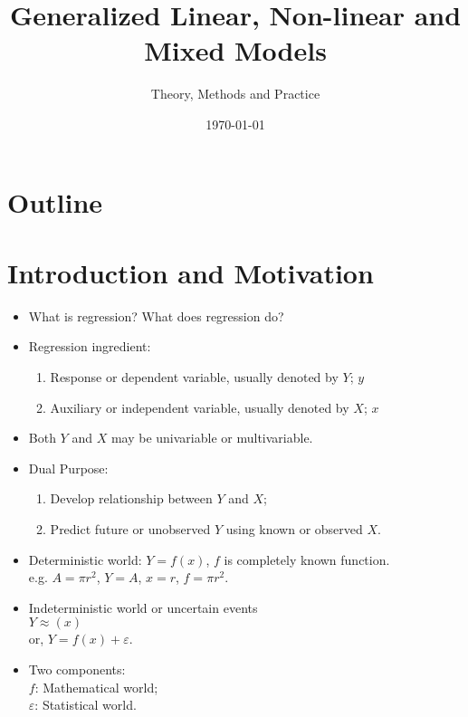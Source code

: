 \documentclass[12pt]{beamer}
\title{Generalized Linear, Non-linear and Mixed Models}
\subtitle{Theory, Methods and Practice}
\date{\today}
\begin{document}
\frame{\titlepage}

\section*{Outline}
\frame{\tableofcontents }



\section{Introduction and Motivation}

\begin{frame}
\begin{itemize}
  \item<1-> What is regression? What does regression do?
  \item<2-> Regression ingredient:
    \begin{enumerate}
    \item<1-> Response or dependent variable, usually denoted by
    $Y$; $y$
    \item<2-> Auxiliary or independent variable, usually denoted by
    $X$; $x$
    \end{enumerate}
  \item<3-> Both $Y$ and $X$ may be univariable or multivariable.
  \item<4-> Dual Purpose:
    \begin{enumerate}
    \item<1-> Develop relationship between $Y$ and $X$;
    \item<2-> Predict future or unobserved $Y$ using known or
    observed $X$.
    \end{enumerate}
  \end{itemize}
\end{frame}

\begin{frame}
  \begin{itemize}
  \item<1-> Deterministic world: $Y=f(x)$, $f$ is completely known
  function.\\
   e.g. $A=\pi r^2$, $Y=A$, $x=r$, $f=\pi r^2$.
   \item<2-> Indeterministic world or uncertain events\\
   $Y\approx (x)$\\
   or, $Y=f(x)+\varepsilon$.
  \item<3-> Two components:\\
  $f$: Mathematical world;\\
  $\varepsilon$: Statistical world.
  \end{itemize}
  \end{frame}
\end{document}

